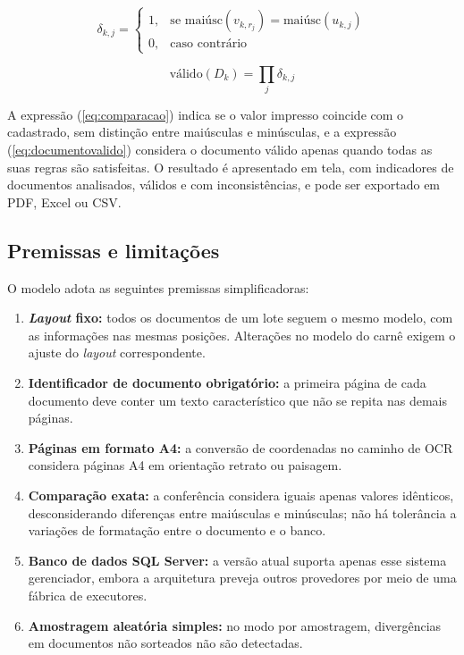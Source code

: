 \documentclass[article,12pt,oneside,a4paper,english,brazil]{abntex2}
\begin{document}
\begin{equation}\label{eq:comparacao}
\delta_{k,j} =
\begin{cases}
1, & \text{se } \mathrm{maiúsc}(v_{k,r_j}) = \mathrm{maiúsc}(u_{k,j}) \\
0, & \text{caso contrário}
\end{cases}
\end{equation}

\begin{equation}\label{eq:documentovalido}
\mathrm{válido}(D_k) = \prod_{j} \delta_{k,j}
\end{equation}

A expressão (\ref{eq:comparacao}) indica se o valor impresso coincide com o
cadastrado, sem distinção entre maiúsculas e minúsculas, e a expressão
(\ref{eq:documentovalido}) considera o documento válido apenas quando todas as suas
regras são satisfeitas. O resultado é apresentado em tela, com indicadores de
documentos analisados, válidos e com inconsistências, e pode ser exportado em PDF,
Excel ou CSV.

\subsection{Premissas e limitações}

O modelo adota as seguintes premissas simplificadoras:

\begin{enumerate}
\item \textbf{\textit{Layout} fixo:} todos os documentos de um lote seguem o mesmo
  modelo, com as informações nas mesmas posições. Alterações no modelo do carnê exigem
  o ajuste do \textit{layout} correspondente.
\item \textbf{Identificador de documento obrigatório:} a primeira página de cada
  documento deve conter um texto característico que não se repita nas demais páginas.
\item \textbf{Páginas em formato A4:} a conversão de coordenadas no caminho de OCR
  considera páginas A4 em orientação retrato ou paisagem.
\item \textbf{Comparação exata:} a conferência considera iguais apenas valores
  idênticos, desconsiderando diferenças entre maiúsculas e minúsculas; não há
  tolerância a variações de formatação entre o documento e o banco.
\item \textbf{Banco de dados SQL Server:} a versão atual suporta apenas esse sistema
  gerenciador, embora a arquitetura preveja outros provedores por meio de uma fábrica
  de executores.
\item \textbf{Amostragem aleatória simples:} no modo por amostragem, divergências em
  documentos não sorteados não são detectadas.
\end{enumerate}
\end{document}
